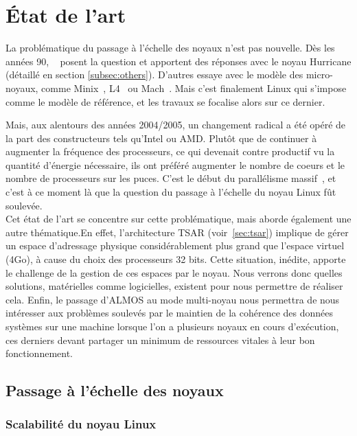 \chapter{État de l’art}

  La problématique du passage à l’échelle des noyaux n’est pas nouvelle. Dès les
  années 90, ~\citeauthor{unrau1995hierarchical} posent la question et apportent
  des réponses avec le noyau Hurricane (détaillé en section
  \ref{subsec:others}). D’autres essaye avec le modèle des
  micro-noyaux, comme Minix~\citep{}, L4~\citep{} ou Mach~\citep{}. Mais c'est
  finalement Linux qui s’impose comme le modèle de référence, et les travaux se
  focalise alors sur ce dernier.

  Mais, aux alentours des années 2004/2005, un changement radical a été opéré de
  la part des constructeurs tels qu’Intel ou AMD. Plutôt que de continuer à
  augmenter la fréquence des processeurs, ce qui devenait contre productif vu la
  quantité d’énergie nécessaire, ils ont préféré augmenter le nombre de coeurs
  et le nombre de processeurs sur les puces. C'est le début du parallélisme
  massif~\citep{patterson2011parallel}, et c'est à ce moment là que la question
  du passage à l’échelle du noyau Linux fût soulevée.\\

  Cet état de l'art se concentre sur cette problématique, mais aborde également
  une autre thématique.En effet, l'architecture TSAR (voir~\ref{sec:tsar})
  implique de gérer un espace d'adressage physique considérablement plus grand
  que l'espace virtuel (4Go), à cause du choix des processeurs 32 bits. Cette
  situation, inédite, apporte le challenge de la gestion de ces espaces par le
  noyau. Nous verrons donc quelles solutions, matérielles comme logicielles,
  existent pour nous permettre de réaliser cela. Enfin, le passage d’ALMOS au
  mode multi-noyau nous permettra de nous intéresser aux problèmes soulevés par
  le maintien de la cohérence des données systèmes sur une machine lorsque l'on
  a plusieurs noyaux en cours d'exécution, ces derniers devant partager un
  minimum de ressources vitales à leur bon fonctionnement.

  \section{Passage à l’échelle des noyaux}
  \label{sec:scalability}

    \subsection{Scalabilité du noyau Linux}

